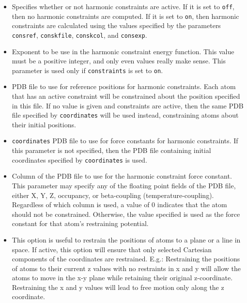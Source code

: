 \begin{itemize}

\item
{}
{Specifies whether or not harmonic constraints are active.  If it 
is set to {\tt off}, then no harmonic constraints are computed.  
If it is set to {\tt on}, then 
harmonic constraints are calculated using the values specified 
by the parameters {\tt consref}, {\tt conskfile}, {\tt conskcol}, 
and {\tt consexp}.}

\item
{}
{Exponent to be use in the harmonic constraint energy function.  
This value must be a positive integer, and only even values really make 
sense.  This parameter is used only if {\tt constraints} is set to 
{\tt on}.}

\item
{}
{PDB file to use for reference positions for harmonic constraints.  
Each atom that has an active constraint will be constrained about 
the position specified in this file.  If no value is given and constraints 
are active, then the same PDB file specified by {\tt coordinates} will be 
used instead, constraining atoms about their initial positions.}

\item
{} {{\tt coordinates}}
{PDB file to use for force constants for 
harmonic constraints.  
If this parameter is not specified, then 
the PDB file containing initial coordinates specified by 
{\tt coordinates} is used.}

\item
{}
{Column of the PDB file to use for the harmonic constraint force constant.
This parameter may specify any of the floating point fields of the PDB file, 
either X, Y, Z, occupancy, or beta-coupling (temperature-coupling).  
Regardless of which column is used, a value of 0 indicates that the atom 
should not be constrained.  
Otherwise, the value specified is used as the force constant for 
that atom's restraining potential.}

\item
{}
{This option is useful to restrain the positions of atoms to a plane or a line in space. If active,
 this option will ensure that only selected Cartesian components of the coordinates are restrained.
 E.g.: Restraining the positions of atoms to their current z values with no restraints
 in x and y will allow the atoms to move in the x-y plane while retaining their original z-coordinate.
 Restraining the x and y values will lead to free motion only along the z coordinate.}


\end{itemize}
